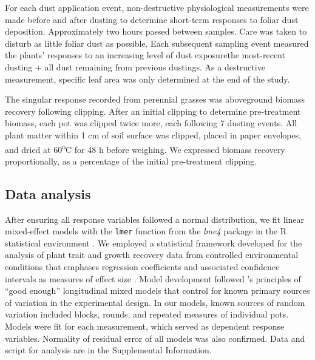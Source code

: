 \documentclass{svjour3}
\begin{document}
For each dust application event, non-destructive physiological measurements were made before and after dusting to determine short-term responses to foliar dust deposition. 
Approximately two hours passed between samples.
Care was taken to disturb as little foliar dust as possible.
Each subsequent sampling event measured the plants' responses to an increasing level of dust exposure\textemdash the most-recent dusting + all dust remaining from previous dustings. 
As a destructive measurement, specific leaf area was only determined at the end of the study. 

The singular response recorded from perennial grasses was aboveground biomass recovery following clipping. 
After an initial clipping to determine pre-treatment biomass, each pot was clipped twice more, each following 7 dusting events. 
All plant matter within 1 cm of soil surface was clipped, placed in paper envelopes, and dried at 60\textsuperscript{o}C for 48 h before weighing.
We expressed biomass recovery proportionally, as a percentage of the initial pre-treatment clipping. 

\subsection{Data analysis}

After ensuring all response variables followed a normal distribution, we fit linear mixed-effect models with the \texttt{lmer} function from the \emph{lme4} package in the \textsf{R} statistical environment \citep{bates2015, rcoreteam2019}. 
We employed a statistical framework developed for the analysis of plant trait and growth recovery data from controlled environmental conditions that emphases regression coefficients and associated confidence intervals as measures of effect size \citep{rinella2010,mcgranahan2018, mcgranahan2018b}. 
Model development followed \citet{cheng2010}'s principles of ``good enough'' longitudinal mixed models that control for known primary sources of variation in the experimental design. 
In our models, known sources of random variation included blocks, rounds, and repeated measures of individual pots. 
Models were fit for each measurement, which served as dependent response variables. 
Normality of residual error of all models was also confirmed. 
Data and script for analysis are in the Supplemental Information. 
\end{document}

